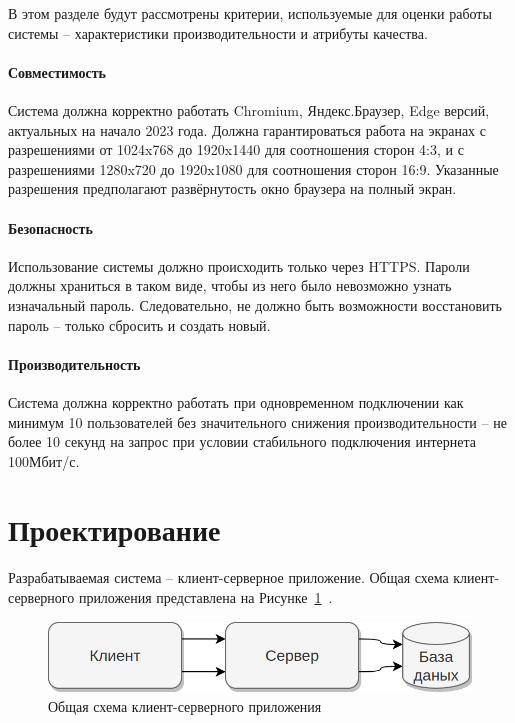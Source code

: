 \documentclass[a4paper,article]{article}
\begin{document}
\begin{sloppypar}
    В этом разделе будут рассмотрены критерии, используемые для оценки работы системы -- характеристики производительности и атрибуты качества.

    \paragraph{Совместимость}\label{ТЗ. Интерфейс пользователя}

    Система должна корректно работать Chromium, Яндекс.Браузер, Edge версий, актуальных на начало 2023 года. Должна гарантироваться работа на экранах с разрешениями от 1024x768 до 1920x1440 для соотношения сторон 4:3, и с разрешениями 1280x720 до 1920x1080 для соотношения сторон 16:9. Указанные разрешения предполагают развёрнутость окно браузера на полный экран.

    \paragraph{Безопасность}\label{ТЗ. Безопасность}

    Использование системы должно происходить только через HTTPS. Пароли должны храниться в таком виде, чтобы из него было невозможно узнать изначальный пароль. Следовательно, не должно быть возможности восстановить пароль -- только сбросить и создать новый.

    \paragraph{Производительность}\label{ТЗ. Производительность}

    Система должна корректно работать при одновременном подключении как минимум 10 пользователей без значительного снижения производительности -- не более 10 секунд на запрос при условии стабильного подключения интернета 100Мбит/с.

    \newpage

    \section{Проектирование}\label{Проектирование}

    Разрабатываемая система -- клиент-серверное приложение. Общая схема клиент-серверного приложения представлена на Рисунке~\ref{fig:Схема клиент-серверного приложения}~\cite{webapi, cleanarch}.

    \begin{figure}[h]
        \centering
        \includegraphics[width=0.6\linewidth]{Схема клиент-серверного приложения.png}
        \caption{\centering Общая схема клиент-серверного приложения}
        \label{fig:Схема клиент-серверного приложения}
    \end{figure}


\end{sloppypar}
\end{document}
